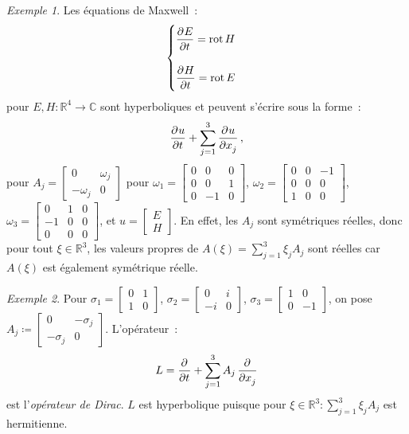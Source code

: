 \documentclass{report}
\DeclareMathOperator{\rot}{rot}
\newcommand{\C}{{\mathbb C}}
\newcommand{\R}{{\mathbb R}}
\theoremstyle{definition}
\theoremstyle{remark}
\newtheorem{ex}{Exemple}[chapter]
\begin{document}
\begin{ex}
Les équations de Maxwell~:
\[\begin{cases}\dpd Et = \rot H\\&\\\dpd Ht = \rot E\end{cases}\]
pour $E, H : \R^4 \to \C$ sont hyperboliques et peuvent s'écrire sous la forme~:
\[\dpd ut + \sum_{j=1}^3\dpd u{x_j},\]
pour $A_j = \begin{bmatrix}0 & \omega_j \\-\omega_j & 0\end{bmatrix}$ pour $\omega_1 = \begin{bmatrix}0 & 0 & 0\\0 & 0 & 1\\0 & -1 & 0\end{bmatrix}$,
$\omega_2 = \begin{bmatrix}0 & 0 & -1\\0 & 0 & 0\\1 & 0 & 0\end{bmatrix}$, $\omega_3 = \begin{bmatrix}0 & 1 & 0\\-1 & 0 & 0\\0 & 0 & 0\end{bmatrix}$, et
$u = \begin{bmatrix}E\\H\end{bmatrix}$. En effet, les $A_j$ sont symétriques réelles, donc pour tout $\xi \in \R^3$, les valeurs propres de $A(\xi) = \sum_{j=1}^3\xi_jA_j$
sont réelles car $A(\xi)$ est également symétrique réelle.
\end{ex}

\begin{ex}
Pour $\sigma_1 = \begin{bmatrix}0 & 1 \\1 & 0\end{bmatrix}$, $\sigma_2 = \begin{bmatrix}0 & i \\-i & 0\end{bmatrix}$, $\sigma_3 = \begin{bmatrix}1 & 0\\0 & -1\end{bmatrix}$,
on pose $A_j \coloneqq \begin{bmatrix}0 & -\sigma_j\\-\sigma_j & 0\end{bmatrix}$. L'opérateur~:
\[L = \dpd {}t + \sum_{j=1}^3A_j\dpd {}{x_j}\]
est l'\textit{opérateur de Dirac}.
$L$ est hyperbolique puisque pour $\xi \in \R^3 : \sum_{j=1}^3\xi_jA_j$ est hermitienne.
\end{ex}
\end{document}

